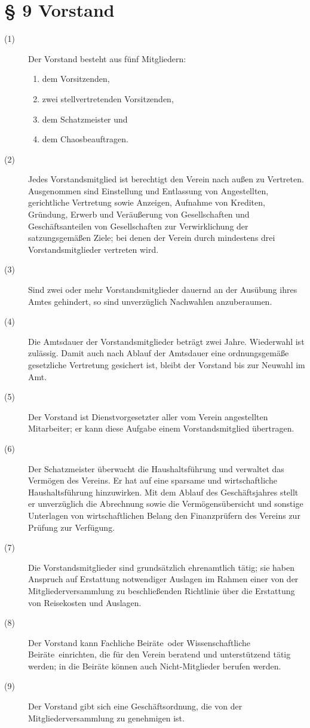 \documentclass[12pt,paper=a4,ngerman]{scrreprt}
\begin{document}
\section{\S{} 9 Vorstand}
\begin{description}
	\item[(1)] Der Vorstand besteht aus fünf Mitgliedern:
	\begin{enumerate}
		\item dem Vorsitzenden,
		\item zwei stellvertretenden Vorsitzenden,
		\item dem Schatzmeister und
		\item dem Chaosbeauftragen.
	\end{enumerate}
	\item[(2)] Jedes Vorstandsmitglied ist berechtigt den Verein nach außen zu Vertreten. Ausgenommen sind Einstellung und Entlassung von Angestellten, gerichtliche Vertretung sowie Anzeigen, Aufnahme von Krediten, Gründung, Erwerb und Veräußerung von Gesellschaften und Geschäftsanteilen von Gesellschaften zur Verwirklichung der satzungsgemäßen Ziele; bei denen der Verein durch mindestens drei Vorstandsmitglieder vertreten wird.
	\item[(3)] Sind zwei oder mehr Vorstandsmitglieder dauernd an der Ausübung ihres Amtes gehindert, so sind unverzüglich Nachwahlen anzuberaumen.
	\item[(4)] Die Amtsdauer der Vorstandsmitglieder beträgt zwei Jahre. Wiederwahl ist zulässig. Damit auch nach Ablauf der Amtsdauer eine ordnungsgemäße gesetzliche Vertretung gesichert ist, bleibt der Vorstand bis zur Neuwahl im Amt.
	\item[(5)] Der Vorstand ist Dienstvorgesetzter aller vom Verein angestellten Mitarbeiter; er kann diese Aufgabe einem Vorstandsmitglied übertragen.
	\item[(6)] Der Schatzmeister überwacht die Haushaltsführung und verwaltet das Vermögen des Vereins. Er hat auf eine sparsame und wirtschaftliche Haushaltsführung hinzuwirken. Mit dem Ablauf des Geschäftsjahres stellt er unverzüglich die Abrechnung sowie die Vermögensübersicht und sonstige Unterlagen von wirtschaftlichen Belang den Finanzprüfern des Vereins zur Prüfung zur Verfügung.
	\item[(7)] Die Vorstandsmitglieder sind grundsätzlich ehrenamtlich tätig; sie haben Anspruch auf Erstattung notwendiger Auslagen im Rahmen einer von der Mitgliederversammlung zu beschließenden Richtlinie über die Erstattung von Reisekosten und Auslagen.
	\item[(8)] Der Vorstand kann \glqq Fachliche Beiräte\grqq ~oder \glqq Wissenschaftliche Beiräte\grqq ~einrichten, die für den Verein beratend und unterstützend tätig werden; in die Beiräte können auch Nicht-Mitglieder berufen werden.
	\item[(9)] Der Vorstand gibt sich eine Geschäftsordnung, die von der Mitgliederversammlung zu genehmigen ist.
\end{description}
\end{document}
